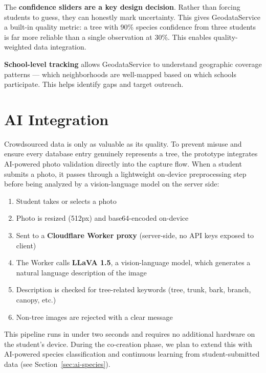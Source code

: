 \documentclass[11pt,a4paper]{article}
\begin{document}
The \textbf{confidence sliders are a key design decision}. Rather than forcing students to guess, they can honestly mark uncertainty. This gives GeodataService a built-in quality metric: a tree with 90\% species confidence from three students is far more reliable than a single observation at 30\%. This enables quality-weighted data integration.

\textbf{School-level tracking} allows GeodataService to understand geographic coverage patterns --- which neighborhoods are well-mapped based on which schools participate. This helps identify gaps and target outreach.

\clearpage
\section{AI Integration}

Crowdsourced data is only as valuable as its quality. To prevent misuse and ensure every database entry genuinely represents a tree, the prototype integrates AI-powered photo validation directly into the capture flow. When a student submits a photo, it passes through a lightweight on-device preprocessing step before being analyzed by a vision-language model on the server side:

\begin{enumerate}
  \item Student takes or selects a photo
  \item Photo is resized (512px) and base64-encoded on-device
  \item Sent to a \textbf{Cloudflare Worker proxy} (server-side, no API keys exposed to client)
  \item The Worker calls \textbf{LLaVA 1.5}, a vision-language model, which generates a natural language description of the image
  \item Description is checked for tree-related keywords (tree, trunk, bark, branch, canopy, etc.)
  \item Non-tree images are rejected with a clear message
\end{enumerate}

This pipeline runs in under two seconds and requires no additional hardware on the student's device. During the co-creation phase, we plan to extend this with AI-powered species classification and continuous learning from student-submitted data (see Section~\ref{sec:ai-species}).

\clearpage
\end{document}
